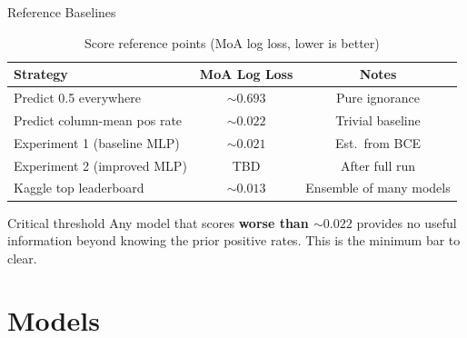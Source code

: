 \documentclass[aspectratio=169, 10pt]{beamer}
\begin{document}
\begin{frame}{Reference Baselines}
  \begin{table}
    \caption{Score reference points (MoA log loss, lower is better)}
    \begin{tabular}{lcc}
      \toprule
      \textbf{Strategy} & \textbf{MoA Log Loss} & \textbf{Notes} \\
      \midrule
      Predict 0.5 everywhere      & $\sim 0.693$ & Pure ignorance \\
      Predict column-mean pos rate & $\sim 0.022$ & Trivial baseline \\
      \rowcolor{yellow!25}
      Experiment 1 (baseline MLP) & $\sim 0.021$ & Est.\ from BCE \\
      \rowcolor{green!15}
      Experiment 2 (improved MLP) & TBD          & After full run \\
      Kaggle top leaderboard      & $\sim 0.013$ & Ensemble of many models \\
      \bottomrule
    \end{tabular}
  \end{table}

  \vspace{0.4em}
  \begin{exampleblock}{Critical threshold}
    Any model that scores \textbf{worse than $\sim 0.022$} provides no useful
    information beyond knowing the prior positive rates.
    This is the minimum bar to clear.
  \end{exampleblock}
\end{frame}

\section{Models}
\end{document}
